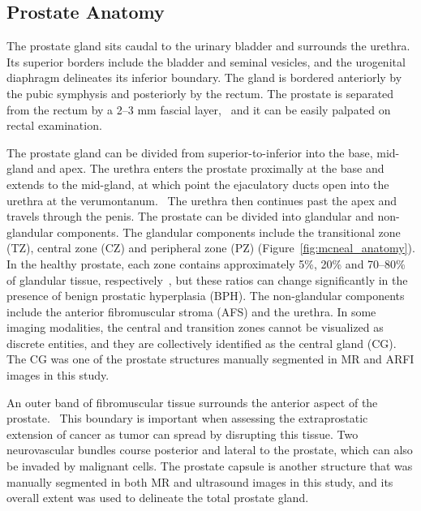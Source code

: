﻿\subsection{Prostate Anatomy}
The prostate gland sits caudal to the urinary bladder and surrounds the urethra.
Its superior borders include the bladder and seminal vesicles, and the
urogenital diaphragm delineates its inferior boundary. The gland is bordered
anteriorly by the pubic symphysis and posteriorly by the rectum.  The prostate
is separated from the rectum by a 2--3 mm fascial layer,~\cite{Jung2012} and it
can be easily palpated on rectal examination. 

The prostate gland can be divided from superior-to-inferior into the base,
mid-gland and apex. The urethra enters the prostate proximally at the base and
extends to the mid-gland, at which point the ejaculatory ducts open into the
urethra at the verumontanum.~\cite{Jung2012} The urethra then continues past
the apex and travels through the penis. The prostate can be divided into
glandular and non-glandular components.  The glandular components include the
transitional zone (TZ), central zone (CZ) and peripheral zone (PZ)
(Figure~\ref{fig:mcneal_anatomy}). In the healthy prostate, each zone contains
approximately 5\%, 20\% and 70--80\% of glandular tissue,
respectively~\cite{Bonekamp2011}, but these ratios can change significantly in
the presence of benign prostatic hyperplasia (BPH). The non-glandular
components include the anterior fibromuscular stroma (AFS) and the urethra.  In
some imaging modalities, the central and transition zones cannot be visualized
as discrete entities, and they are collectively identified as the central gland
(CG).  The CG was one of the prostate structures manually segmented in MR and
ARFI images in this study.



An outer band of fibromuscular tissue surrounds the anterior aspect of the
prostate.~\cite{Bonekamp2011} This boundary is important when assessing the
extraprostatic extension of cancer as tumor can spread by disrupting this
tissue. Two neurovascular bundles course posterior and lateral to the prostate,
which can also be invaded by malignant cells.  The prostate capsule is another
structure that was manually segmented in both MR and ultrasound images in this
study, and its overall extent was used to delineate the total prostate gland.
